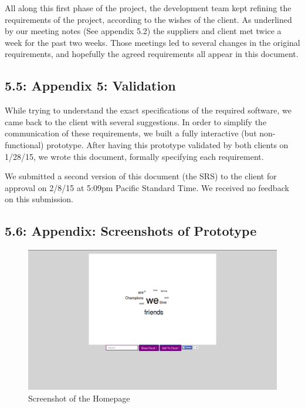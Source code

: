 \documentclass[]{article}
\begin{document}
All along this first phase of the project, the development team kept
refining the requirements of the project, according to the wishes of the
client. As underlined by our meeting notes (See appendix 5.2) the
suppliers and client met twice a week for the past two weeks. Those
meetings led to several changes in the original requirements, and
hopefully the agreed requirements all appear in this document.

\subsection{5.5: Appendix 5: Validation}\label{appendix-5-validation}

While trying to understand the exact specifications of the required
software, we came back to the client with several suggestions. In order
to simplify the communication of these requirements, we built a fully
interactive (but non-functional) prototype. After having this prototype
validated by both clients on 1/28/15, we wrote this document, formally
specifying each requirement.

We submitted a second version of this document (the SRS) to the client
for approval on 2/8/15 at 5:09pm Pacific Standard Time. We received no
feedback on this submission.

\subsection{5.6: Appendix: Screenshots of
Prototype}\label{appendix-screenshots-of-prototype}

\begin{figure}[htbp]
\centering
\includegraphics{Homepage.png}
\caption{Screenshot of the Homepage}
\end{figure}
\end{document}
